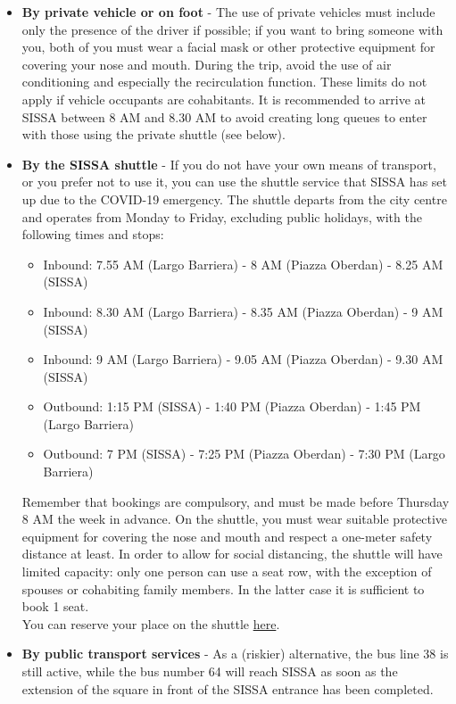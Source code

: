 \documentclass{sissavademecum}
\begin{document}
\begin{itemize}
	\item \textbf{By private vehicle or on foot} - The use of private vehicles must include only the presence of the driver if possible; if you want to bring someone with you, both of you must wear a facial mask or other protective equipment for covering your nose and mouth. During the trip, avoid the use of air conditioning and especially the recirculation function. These limits do not apply if vehicle occupants are cohabitants. It is recommended to arrive at SISSA between 8 AM and 8.30 AM to avoid creating long queues to enter with those using the private shuttle (see below).
	
	\item \textbf{By the SISSA shuttle} - If you do not have your own means of transport, or you prefer not to use it, you can use the shuttle service that SISSA has set up due to the COVID-19 emergency. The shuttle departs from the city centre and operates from Monday to Friday, excluding public holidays, with the following times and stops:
	\begin{itemize}
		\item Inbound: 7.55 AM (Largo Barriera) - 8 AM (Piazza Oberdan) - 8.25 AM (SISSA)
		\item Inbound: 8.30 AM (Largo Barriera) - 8.35 AM (Piazza Oberdan) - 9 AM (SISSA)
		\item Inbound: 9 AM (Largo Barriera) - 9.05 AM (Piazza Oberdan) - 9.30 AM (SISSA)
		\item Outbound: 1:15 PM (SISSA) - 1:40 PM (Piazza Oberdan) - 1:45 PM (Largo Barriera)
		\item Outbound: 7 PM (SISSA) - 7:25 PM (Piazza Oberdan) - 7:30 PM (Largo Barriera)
	\end{itemize}
	Remember that bookings are compulsory, and must be made before Thursday 8 AM the week in advance. On the shuttle, you must wear suitable protective equipment for covering the nose and mouth and respect a one-meter safety distance at least. In order to allow for social distancing, the shuttle will have limited capacity: only one person can use a seat row, with the exception of spouses or cohabiting family members. In the latter case it is sufficient to book 1 seat. \\
	You can reserve your place on the shuttle \href{https://sissa-my.sharepoint.com/:x:/g/personal/tomicich_sissa_it/EawtTu5bUChBou8M1yikFLwB8AhuiMMCR-zscX84sRPWrQ?rtime=VgDdcu692Eg}{here}.
	
	\item \textbf{By public transport services} - As a (riskier) alternative, the bus line 38 is still active, while the bus number 64 will reach SISSA as soon as the extension of the square in front of the SISSA entrance has been completed.
\end{itemize}
\end{document}
